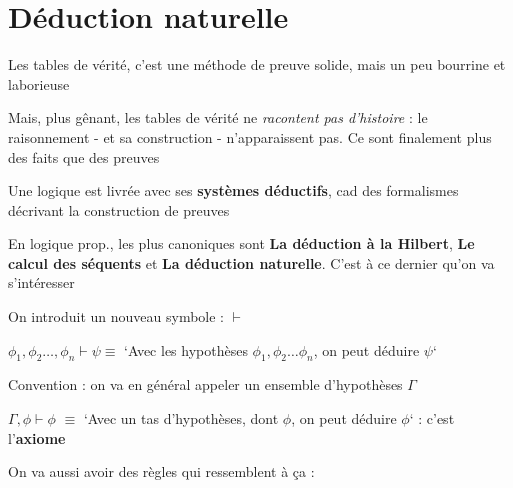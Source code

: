 
\section{Déduction naturelle}

\begin{frame}
	
	 Les tables de vérité, c'est une méthode de preuve solide, mais un peu bourrine et laborieuse\pause\newline
	
	Mais, plus gênant, les tables de vérité ne \textit{racontent pas d'histoire} : \pause le raisonnement - et sa construction - n'apparaissent pas. \pause Ce sont finalement plus des faits que des preuves\pause\newline
	 
	Une logique est livrée avec ses \textbf{systèmes déductifs}, cad des formalismes décrivant la construction de preuves\pause\newline
	
	En logique prop., les plus canoniques sont \textbf{La déduction à la Hilbert}, \textbf{Le calcul des séquents} et \textbf{La déduction naturelle}. C'est à ce dernier qu'on va s'intéresser
	
\end{frame}


\begin{frame}
	
	 On introduit un nouveau symbole : $\vdash$\pause\newline
	 
	 $\phi_1, \phi_2 \dots, \phi_n \vdash \psi \equiv $ `Avec les hypothèses $\phi_1, \phi_2 \dots \phi_n$, on peut déduire $\psi$`\pause\newline
	 
	 Convention : on va en général appeler un ensemble d'hypothèses $\Gamma$\pause\newline
	 
	 $\Gamma, \phi \vdash \phi$ $\equiv$ `Avec un tas d'hypothèses, dont $\phi$, on peut déduire $\phi$` \pause : c'est l'\textbf{axiome}\pause\newline
	 
	 On va aussi avoir des règles qui ressemblent à ça :
	 
	 \begin{prooftree}
\end{prooftree}

	
\end{frame}

